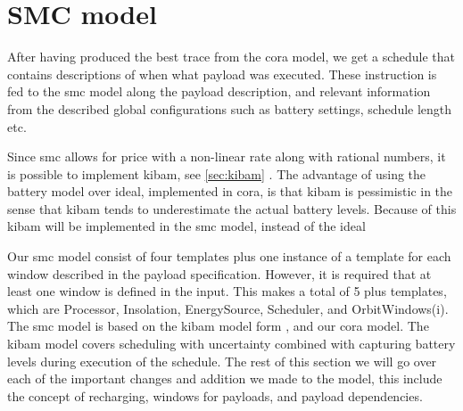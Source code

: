 \section{SMC model} \label{sec:smc_model}
After having produced the best trace from the \gls{cora} model, we get a schedule that contains descriptions of when what payload was executed. These instruction is fed to the \gls{smc} model along the payload description, and relevant information from the described global configurations such as battery settings, schedule length etc.

Since \gls{smc} allows for price with a non-linear rate along with rational numbers, it is possible to implement \gls{kibam}, see \ref{sec:kibam} . The advantage of using the battery model over ideal, implemented in \gls{cora}, is that \gls{kibam} is pessimistic in the sense that \gls{kibam} tends to underestimate the actual battery levels. Because of this \gls{kibam} will be implemented in the \gls{smc} model, instead of the ideal

Our \gls{smc} model consist of four templates plus one instance of a template for each window described in the payload specification. However, it is required that at least one window is defined in the input. This makes a total of 5 plus templates, which are Processor, Insolation, EnergySource, Scheduler, and OrbitWindows(i).\\ 
The \gls{smc} model is based on the \gls{kibam} model form \cite{battery_aware_scheduling}, and our \gls{cora} model. The \gls{kibam} model covers scheduling with uncertainty combined with capturing battery levels during execution of the schedule. The rest of this section we will go over each of the important changes and addition we made to the model, this include the concept of recharging, windows for payloads, and payload dependencies. 
